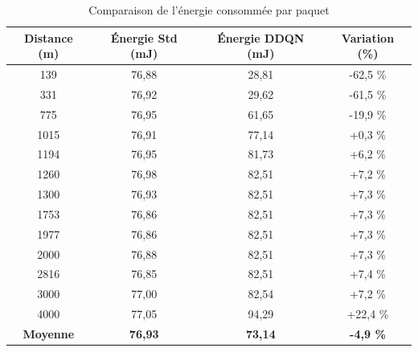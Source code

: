 \begin{itemize}
	\begin{table}[H]
		\centering
		\caption{Comparaison de l'énergie consommée par paquet}
		\label{tab:comparaison-energie}
		\begin{tabular}{|c|c|c|c|}
			\hline
			\textbf{Distance (m)} & \textbf{Énergie Std (mJ)} & \textbf{Énergie DDQN (mJ)} & \textbf{Variation (\%)} \\
			\hline
			\hline
			139  & 76,88 & 28,81  & \cellcolor{green!30} -62,5 \% \\
			\hline
			331  & 76,92 & 29,62  & \cellcolor{green!30} -61,5 \% \\
			\hline
			775  & 76,95 & 61,65  & \cellcolor{green!30} -19,9 \% \\
			\hline
			1015 & 76,91 & 77,14  & \cellcolor{red!30} +0,3 \% \\
			\hline
			1194 & 76,95 & 81,73  &\cellcolor{red!30} +6,2 \% \\
			\hline
			1260 & 76,98 & 82,51  &\cellcolor{red!30} +7,2 \% \\
			\hline
			1300 & 76,93 & 82,51  &\cellcolor{red!30} +7,3 \% \\
			\hline
			1753 & 76,86 & 82,51  &\cellcolor{red!30} +7,3 \% \\
			\hline
			1977 & 76,86 & 82,51  & \cellcolor{red!30}+7,3 \% \\
			\hline
			2000 & 76,88 & 82,51  & \cellcolor{red!30}+7,3 \% \\
			\hline
			2816 & 76,85 & 82,51  &\cellcolor{red!30} +7,4 \% \\
			\hline
			3000 & 77,00 & 82,54  & \cellcolor{red!30}+7,2 \% \\
			\hline
			4000 & 77,05 & 94,29  &\cellcolor{red!30} +22,4 \% \\
			\hline
			\hline
			\textbf{Moyenne} & \textbf{76,93} & \textbf{73,14} & \cellcolor{green!30} \textbf{-4,9 \%} \\
			\hline
		\end{tabular}
	\end{table}
	

\end{itemize}

